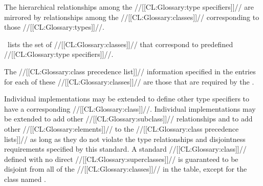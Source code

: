 The hierarchical relationships among the //[[CL:Glossary:type specifiers]]// are mirrored by relationships among the //[[CL:Glossary:classes]]// corresponding to those //[[CL:Glossary:types]]//.  

                  \figref\ClassTypeCorrespondence\ lists the set of //[[CL:Glossary:classes]]//  that correspond to predefined //[[CL:Glossary:type specifiers]]//.

  

The //[[CL:Glossary:class precedence list]]// information specified in the entries for each of these //[[CL:Glossary:classes]]// are those that are required by the \OS.

Individual implementations may be extended to define other type specifiers to have a corresponding //[[CL:Glossary:class]]//.  Individual implementations may be extended to add other //[[CL:Glossary:subclass]]// relationships and to add other //[[CL:Glossary:elements]]// to the //[[CL:Glossary:class precedence lists]]// as long as they do not violate the type relationships and disjointness requirements specified by this standard. A standard //[[CL:Glossary:class]]// defined with no direct //[[CL:Glossary:superclasses]]// is guaranteed to be disjoint from all of the //[[CL:Glossary:classes]]// in the table, except for the class named .
  \endsubSection%
